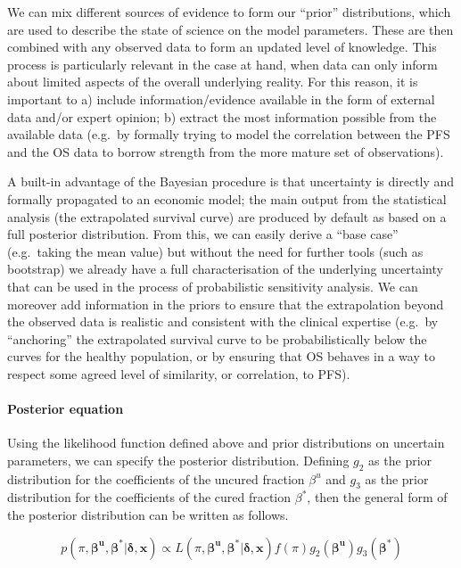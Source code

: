 \documentclass[
]{article}
\begin{document}
We can mix different sources of evidence to form our ``prior''
distributions, which are used to describe the state of science on the
model parameters. These are then combined with any observed data to form
an updated level of knowledge. This process is particularly relevant in
the case at hand, when data can only inform about limited aspects of the
overall underlying reality. For this reason, it is important to a)
include information/evidence available in the form of external data
and/or expert opinion; b) extract the most information possible from the
available data (e.g.~by formally trying to model the correlation between
the PFS and the OS data to borrow strength from the more mature set of
observations).

A built-in advantage of the Bayesian procedure is that uncertainty is
directly and formally propagated to an economic model; the main output
from the statistical analysis (the extrapolated survival curve) are
produced by default as based on a full posterior distribution. From
this, we can easily derive a ``base case'' (e.g.~taking the mean value)
but without the need for further tools (such as bootstrap) we already
have a full characterisation of the underlying uncertainty that can be
used in the process of probabilistic sensitivity analysis. We can
moreover add information in the priors to ensure that the extrapolation
beyond the observed data is realistic and consistent with the clinical
expertise (e.g.~by ``anchoring'' the extrapolated survival curve to be
probabilistically below the curves for the healthy population, or by
ensuring that OS behaves in a way to respect some agreed level of
similarity, or correlation, to PFS).

\hypertarget{posterior-equation}{%
\paragraph{Posterior equation}\label{posterior-equation}}

Using the likelihood function defined above and prior distributions on
uncertain parameters, we can specify the posterior distribution.
Defining \(g_2\) as the prior distribution for the coefficients of the
uncured fraction \(\beta^u\) and \(g_3\) as the prior distribution for
the coefficients of the cured fraction \(\beta^*\), then the general
form of the posterior distribution can be written as follows.

\[
p(\pi, \boldsymbol{\beta^u}, \boldsymbol{\beta^*} | \boldsymbol{\delta}, \boldsymbol{x}) \propto
L(\pi, \boldsymbol{\beta^u}, \boldsymbol{\beta^*} | \boldsymbol{\delta}, \boldsymbol{x}) f(\pi) g_2(\boldsymbol{\beta^u}) g_3(\boldsymbol{\beta^*})
\]
\end{document}
